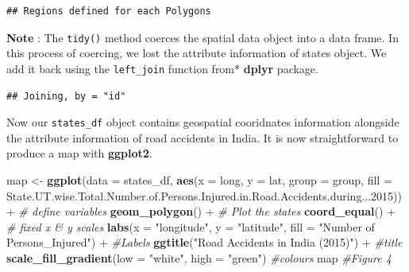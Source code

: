 \documentclass[]{article}
\newenvironment{Shaded}{}{}
\newcommand{\CommentTok}[1]{\textcolor[rgb]{0.38,0.63,0.69}{\textit{#1}}}
\newcommand{\DataTypeTok}[1]{\textcolor[rgb]{0.56,0.13,0.00}{#1}}
\newcommand{\DecValTok}[1]{\textcolor[rgb]{0.25,0.63,0.44}{#1}}
\newcommand{\KeywordTok}[1]{\textcolor[rgb]{0.00,0.44,0.13}{\textbf{#1}}}
\newcommand{\NormalTok}[1]{#1}
\newcommand{\OperatorTok}[1]{\textcolor[rgb]{0.40,0.40,0.40}{#1}}
\newcommand{\StringTok}[1]{\textcolor[rgb]{0.25,0.44,0.63}{#1}}
\begin{document}
\begin{verbatim}
## Regions defined for each Polygons
\end{verbatim}

\textbf{Note} : The \texttt{tidy()} method coerces the spatial data
object into a data frame. In this process of coercing, we lost the
attribute information of states object. We add it back using the
\texttt{left\_join} function from* \textbf{dplyr} package.

\begin{Shaded}
\end{Shaded}

\begin{verbatim}
## Joining, by = "id"
\end{verbatim}

Now our \texttt{states\_df} object contains geospatial cooridnates
information alongside the attribute information of road accidents in
India. It is now straightforward to produce a map with \textbf{ggplot2}.

\begin{Shaded}
\begin{Highlighting}[]
\NormalTok{map <-}\StringTok{ }\KeywordTok{ggplot}\NormalTok{(}\DataTypeTok{data =}\NormalTok{ states_df, }\KeywordTok{aes}\NormalTok{(}\DataTypeTok{x =}\NormalTok{ long, }\DataTypeTok{y =}\NormalTok{ lat, }\DataTypeTok{group =}\NormalTok{ group, }\DataTypeTok{fill =}\NormalTok{ State.UT.wise.Total.Number.of.Persons.Injured.in.Road.Accidents.during...}\DecValTok{2015}\NormalTok{))}\OperatorTok{+}\StringTok{ }\CommentTok{# define variables}
\StringTok{  }\KeywordTok{geom_polygon}\NormalTok{() }\OperatorTok{+}\StringTok{ }\CommentTok{# Plot the states}
\StringTok{  }\KeywordTok{coord_equal}\NormalTok{() }\OperatorTok{+}\StringTok{ }\CommentTok{# fixed x & y scales}
\StringTok{  }\KeywordTok{labs}\NormalTok{(}\DataTypeTok{x =} \StringTok{"longitude"}\NormalTok{, }\DataTypeTok{y =} \StringTok{"latitude"}\NormalTok{, }\DataTypeTok{fill =} \StringTok{"Number of Persons_Injured"}\NormalTok{) }\OperatorTok{+}\StringTok{ }\CommentTok{#Labels}
\StringTok{  }\KeywordTok{ggtitle}\NormalTok{(}\StringTok{"Road Accidents in India (2015)"}\NormalTok{) }\OperatorTok{+}\StringTok{ }\CommentTok{#title}
\StringTok{  }\KeywordTok{scale_fill_gradient}\NormalTok{(}\DataTypeTok{low =} \StringTok{"white"}\NormalTok{, }\DataTypeTok{high =} \StringTok{"green"}\NormalTok{) }\CommentTok{#colours}
\NormalTok{map }\CommentTok{#Figure 4 }
\end{Highlighting}
\end{Shaded}
\end{document}
